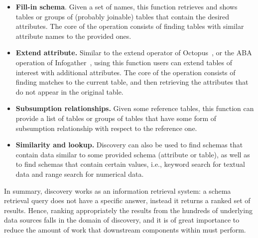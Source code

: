 \begin{itemize}
\item \textbf{Fill-in schema}. Given a set of names, this function
retrieves and shows tables or groups of (probably joinable) tables that contain
the desired attributes. The core of the operation consists of finding tables
with similar attribute names to the provided ones.

\item \textbf{Extend attribute.} Similar to the extend operator of Octopus~\cite{octopus}, or the ABA operation of Infogather~\cite{DBLP:conf/sigmod/YakoutGCC12}, using this function users
can extend tables of interest with additional attributes. The
core of the operation consists of finding matches to the current table, and then
retrieving the attributes that do not appear in the original table.

\item \textbf{Subsumption relationships.} Given some reference tables,
this function can provide a list of tables or groups of tables that have some form
of subsumption relationship with respect to the reference one. 

\item \textbf{Similarity and lookup.} Discovery can also be used to find schemas
that contain data similar to some provided schema (attribute or table), as well
as to find schemas that contain certain values, i.e., keyword search for
textual data and range search for numerical data.
\end{itemize}

In summary, discovery works as an information retrieval system: a schema retrieval query
does not have a specific answer, instead it returns a ranked set of results.
Hence, ranking appropriately the results from the hundreds of underlying data
sources falls in the domain of discovery, and it is of great importance to reduce
the amount of work that downstream components  within \dcv must perform.

